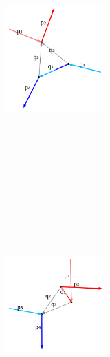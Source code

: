 \documentclass[
  11pt,
  a4paper,
  DIV=11,
  numbers=noendperiod,
  twoside]{scrreprt}
\DeclareRobustCommand{\[}{\begin{equation}}
\DeclareRobustCommand{\]}{\end{equation}}
\begin{document}
\begin{figure}
\begin{minipage}[t]{0.25\linewidth}
{\begin{figure}[H]
{}

\end{figure}

}

\end{minipage}%
\newline
\begin{minipage}[t]{0.25\linewidth}

{\centering 

\begin{figure}[H]

{\centering \includegraphics[width=1.5in,height=3.5in]{./scattering_files/figure-latex/dot-figure-18.png}

}

\end{figure}

}

\end{minipage}%
%
\begin{minipage}[t]{0.25\linewidth}

{\centering 

\begin{figure}[H]

{\centering \includegraphics[width=1.5in,height=3.5in]{./scattering_files/figure-latex/dot-figure-17.png}

}
\end{figure}}
\end{minipage}
\end{figure}
\end{document}
